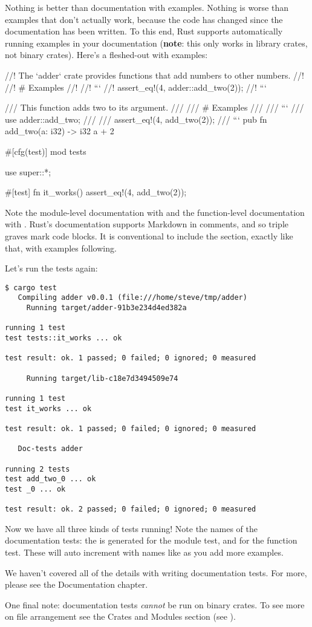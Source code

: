 Nothing is better than documentation with examples. Nothing is worse than examples that don't actually work, because the code has 
changed since the documentation has been written. To this end, Rust supports automatically running examples in your documentation 
(\textbf{note}: this only works in library crates, not binary crates). Here's a fleshed-out  with examples:

\begin{rustc}
//! The `adder` crate provides functions that add numbers to other numbers.
//!
//! # Examples
//!
//! ```
//! assert_eq!(4, adder::add_two(2));
//! ```

/// This function adds two to its argument.
///
/// # Examples
///
/// ```
/// use adder::add_two;
///
/// assert_eq!(4, add_two(2));
/// ```
pub fn add_two(a: i32) -> i32 {
    a + 2
}

#[cfg(test)]
mod tests {
    use super::*;

    #[test]
    fn it_works() {
        assert_eq!(4, add_two(2));
    }
}
\end{rustc}

Note the module-level documentation with \code{//!} and the function-level documentation with \code{///}. Rust's documentation 
supports Markdown in comments, and so triple graves mark code blocks. It is conventional to include the  section, 
exactly like that, with examples following.

\blank

Let's run the tests again:

\begin{verbatim}
$ cargo test
   Compiling adder v0.0.1 (file:///home/steve/tmp/adder)
     Running target/adder-91b3e234d4ed382a

running 1 test
test tests::it_works ... ok

test result: ok. 1 passed; 0 failed; 0 ignored; 0 measured

     Running target/lib-c18e7d3494509e74

running 1 test
test it_works ... ok

test result: ok. 1 passed; 0 failed; 0 ignored; 0 measured

   Doc-tests adder

running 2 tests
test add_two_0 ... ok
test _0 ... ok

test result: ok. 2 passed; 0 failed; 0 ignored; 0 measured
\end{verbatim}

Now we have all three kinds of tests running! Note the names of the documentation tests: the  is generated for the module 
test, and  for the function test. These will auto increment with names like  as you add more examples.

\blank

We haven’t covered all of the details with writing documentation tests. For more, please see the Documentation chapter.

\blank

One final note: documentation tests \emph{cannot} be run on binary crates. To see more on file arrangement see the Crates and Modules section
(see ).
